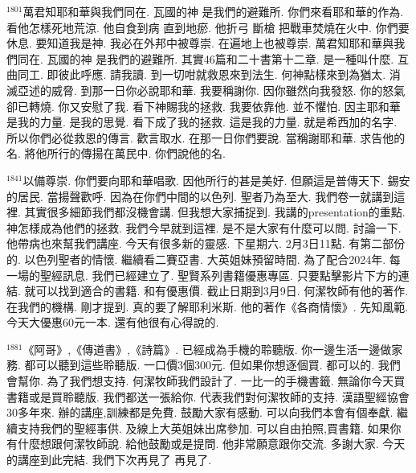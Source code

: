 \documentclass{book}
\begin{document}
$^{1801}$萬君知耶和華與我們同在.
瓦國的神 是我們的避難所.
你們來看耶和華的作為.
看他怎樣死地荒涼.
他自食到病 直到地瘀.
他折弓 斷槍 把戰車焚燒在火中.
你們要休息.
要知道我是神.
我必在外邦中被尊崇.
在遍地上也被尊崇.
萬君知耶和華與我們同在.
瓦國的神 是我們的避難所.
其實46篇和二十書第十二章.
是一種叫什麼.
互曲同工.
即彼此呼應.
請我讀.
到一切咁就救恩來到法生.
何神點樣來到為猶太.
消滅亞述的威脅.
到那一日你必說耶和華.
我要稱謝你.
因你雖然向我發怒.
你的怒氣卻已轉燒.
你又安慰了我.
看下神賜我的拯救.
我要依靠他.
並不懼怕.
因主耶和華是我的力量.
是我的思覺.
看下成了我的拯救.
這是我的力量.
就是希西加的名字.
所以你們必從救恩的傳言.
歡言取水.
在那一日你們要說.
當稱謝耶和華.
求告他的名.
將他所行的傳揚在萬民中.
你們說他的名.

$^{1841}$以備尊崇.
你們要向耶和華唱歌.
因他所行的甚是美好.
但願這是普傳天下.
錫安的居民.
當揚聲歡呼.
因為在你們中間的以色列.
聖者乃為至大.
我們卷一就講到這裡.
其實很多細節我們都沒機會講.
但我想大家捕捉到.
我講的presentation的重點.
神怎樣成為他們的拯救.
我們今早就到這裡.
是不是大家有什麼可以問.
討論一下.
他帶病也來幫我們講座.
今天有很多新的靈感.
下星期六.
2月3日11點.
有第二部份的.
以色列聖者的情懷.
繼續看二賽亞書.
大英姐妹預留時間.
為了配合2024年.
每一場的聖經訊息.
我們已經建立了.
聖賢系列書籍優惠專區.
只要點擊影片下方的連結.
就可以找到適合的書籍.
和有優惠價.
截止日期到3月9日.
何潔牧師有他的著作.
在我們的機構.
剛才提到.
真的要了解耶利米斯.
他的著作《各商情懷》.
先知風範.
今天大優惠60元一本.
還有他很有心得說的.

$^{1881}$《阿哥》,《傳道書》,《詩篇》.
已經成為手機的聆聽版.
你一邊生活一邊做家務.
都可以聽到這些聆聽版.
一口價3個300元.
但如果你想逐個買.
都可以的.
我們會幫你.
為了我們想支持.
何潔牧師我們設計了.
一比一的手機書籤.
無論你今天買書籍或是買聆聽版.
我們都送一張給你.
代表我們對何潔牧師的支持.
漢語聖經協會30多年來.
辦的講座,訓練都是免費.
鼓勵大家有感動.
可以向我們本會有個奉獻.
繼續支持我們的聖經事供.
及線上大英姐妹出席參加.
可以自由拍照,買書籍.
如果你有什麼想跟何潔牧師說.
給他鼓勵或是提問.
他非常願意跟你交流.
多謝大家.
今天的講座到此完結.
我們下次再見了 再見了.
\newpage
\end{document}
